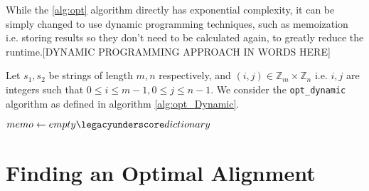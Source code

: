 \documentclass{article}
\renewcommand{\_}{\ifincsname_\else\legacyunderscore\fi}
\newcommand{\integer}{\textbf{int} }
\begin{document}
        While the \ref{alg:opt} algorithm directly has exponential complexity, it can be simply changed to use dynamic programming techniques, such as memoization i.e. storing results so they don't need to be calculated again, to greatly reduce the runtime.[DYNAMIC PROGRAMMING APPROACH IN WORDS HERE]

        Let $s_1, s_2$ be strings of length $m, n$ respectively, and $(i, j) \in \mathbb{Z}_m \times \mathbb{Z}_n$ i.e. $i, j$ are integers such that $0 \leq i \leq m - 1, 0 \leq j \leq n - 1$.  We consider the \texttt{opt\_dynamic} algorithm as defined in algorithm \ref{alg:opt_Dynamic}.

        \begin{function}
            \caption{opt\_dynamic(\integer $i$, \integer $j$)}
            \label{alg:opt_Dynamic}
            $memo \gets empty\_dictionary$ 
        \end{function}

    \section*{Finding an Optimal Alignment}

    \printbibliography
\end{document}
